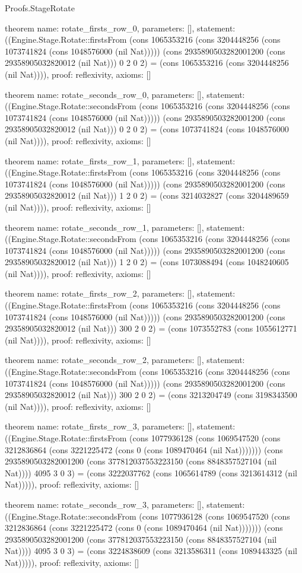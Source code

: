 \begin{lexlean}{Proofs.StageRotate}
\begin{semanticmodule}
theorem{
  name: rotate_firsts_row_0,
  parameters: [],
  statement: ((Engine.Stage.Rotate::firstsFrom (cons 1065353216 (cons 3204448256 (cons 1073741824 (cons 1048576000 (nil Nat))))) (cons 2935890503282001200 (cons 29358905032820012 (nil Nat))) 0 2 0 2) = (cons 1065353216 (cons 3204448256 (nil Nat)))),
  proof: reflexivity{},
  axioms: []
}

theorem{
  name: rotate_seconds_row_0,
  parameters: [],
  statement: ((Engine.Stage.Rotate::secondsFrom (cons 1065353216 (cons 3204448256 (cons 1073741824 (cons 1048576000 (nil Nat))))) (cons 2935890503282001200 (cons 29358905032820012 (nil Nat))) 0 2 0 2) = (cons 1073741824 (cons 1048576000 (nil Nat)))),
  proof: reflexivity{},
  axioms: []
}

theorem{
  name: rotate_firsts_row_1,
  parameters: [],
  statement: ((Engine.Stage.Rotate::firstsFrom (cons 1065353216 (cons 3204448256 (cons 1073741824 (cons 1048576000 (nil Nat))))) (cons 2935890503282001200 (cons 29358905032820012 (nil Nat))) 1 2 0 2) = (cons 3214032827 (cons 3204489659 (nil Nat)))),
  proof: reflexivity{},
  axioms: []
}

theorem{
  name: rotate_seconds_row_1,
  parameters: [],
  statement: ((Engine.Stage.Rotate::secondsFrom (cons 1065353216 (cons 3204448256 (cons 1073741824 (cons 1048576000 (nil Nat))))) (cons 2935890503282001200 (cons 29358905032820012 (nil Nat))) 1 2 0 2) = (cons 1073088494 (cons 1048240605 (nil Nat)))),
  proof: reflexivity{},
  axioms: []
}

theorem{
  name: rotate_firsts_row_2,
  parameters: [],
  statement: ((Engine.Stage.Rotate::firstsFrom (cons 1065353216 (cons 3204448256 (cons 1073741824 (cons 1048576000 (nil Nat))))) (cons 2935890503282001200 (cons 29358905032820012 (nil Nat))) 300 2 0 2) = (cons 1073552783 (cons 1055612771 (nil Nat)))),
  proof: reflexivity{},
  axioms: []
}

theorem{
  name: rotate_seconds_row_2,
  parameters: [],
  statement: ((Engine.Stage.Rotate::secondsFrom (cons 1065353216 (cons 3204448256 (cons 1073741824 (cons 1048576000 (nil Nat))))) (cons 2935890503282001200 (cons 29358905032820012 (nil Nat))) 300 2 0 2) = (cons 3213204749 (cons 3198343500 (nil Nat)))),
  proof: reflexivity{},
  axioms: []
}

theorem{
  name: rotate_firsts_row_3,
  parameters: [],
  statement: ((Engine.Stage.Rotate::firstsFrom (cons 1077936128 (cons 1069547520 (cons 3212836864 (cons 3221225472 (cons 0 (cons 1089470464 (nil Nat))))))) (cons 2935890503282001200 (cons 377812037553223150 (cons 8848357527104 (nil Nat)))) 4095 3 0 3) = (cons 3222037762 (cons 1065614789 (cons 3213614312 (nil Nat))))),
  proof: reflexivity{},
  axioms: []
}

theorem{
  name: rotate_seconds_row_3,
  parameters: [],
  statement: ((Engine.Stage.Rotate::secondsFrom (cons 1077936128 (cons 1069547520 (cons 3212836864 (cons 3221225472 (cons 0 (cons 1089470464 (nil Nat))))))) (cons 2935890503282001200 (cons 377812037553223150 (cons 8848357527104 (nil Nat)))) 4095 3 0 3) = (cons 3224838609 (cons 3213586311 (cons 1089443325 (nil Nat))))),
  proof: reflexivity{},
  axioms: []
}
\end{semanticmodule}
\end{lexlean}
